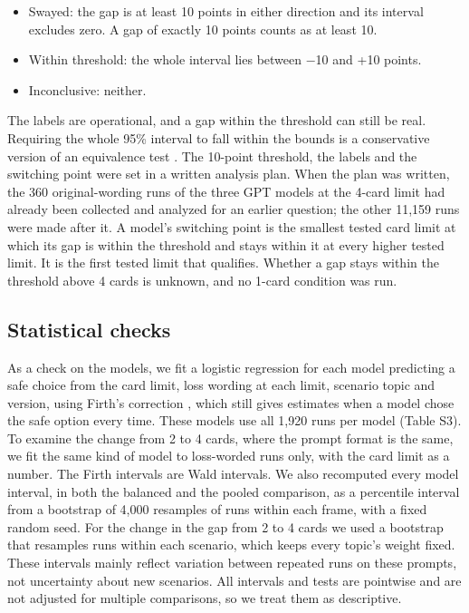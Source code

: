 \documentclass[11pt]{article}
\begin{document}
\begin{itemize}
  \item Swayed: the gap is at least 10 points in either direction and its interval excludes zero. A gap of exactly 10 points counts as at least 10.
  \item Within threshold: the whole interval lies between $-$10 and +10 points.
  \item Inconclusive: neither.
\end{itemize}

The labels are operational, and a gap within the threshold can still be real. Requiring the whole 95\% interval to fall within the bounds is a conservative version of an equivalence test \citep{lakens2017equivalence}. The 10-point threshold, the labels and the switching point were set in a written analysis plan. When the plan was written, the 360 original-wording runs of the three GPT models at the 4-card limit had already been collected and analyzed for an earlier question; the other 11,159 runs were made after it. A model's switching point is the smallest tested card limit at which its gap is within the threshold and stays within it at every higher tested limit. It is the first tested limit that qualifies. Whether a gap stays within the threshold above 4 cards is unknown, and no 1-card condition was run.

\subsection{Statistical checks}

As a check on the models, we fit a logistic regression for each model predicting a safe choice from the card limit, loss wording at each limit, scenario topic and version, using Firth's correction \citep{firth1993bias}, which still gives estimates when a model chose the safe option every time. These models use all 1,920 runs per model (Table S3). To examine the change from 2 to 4 cards, where the prompt format is the same, we fit the same kind of model to loss-worded runs only, with the card limit as a number. The Firth intervals are Wald intervals. We also recomputed every model interval, in both the balanced and the pooled comparison, as a percentile interval from a bootstrap of 4,000 resamples of runs within each frame, with a fixed random seed. For the change in the gap from 2 to 4 cards we used a bootstrap that resamples runs within each scenario, which keeps every topic's weight fixed. These intervals mainly reflect variation between repeated runs on these prompts, not uncertainty about new scenarios. All intervals and tests are pointwise and are not adjusted for multiple comparisons, so we treat them as descriptive.
\end{document}
